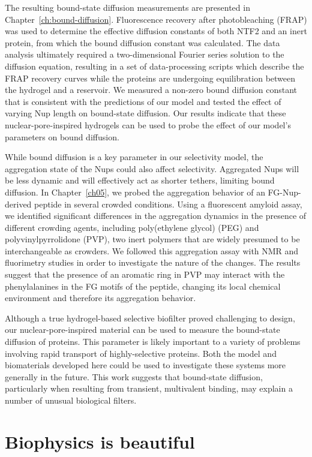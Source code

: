 The resulting bound-state diffusion measurements are presented in Chapter~\ref{ch:bound-diffusion}.  Fluorescence recovery after photobleaching (FRAP) was used to determine the effective diffusion constants of both NTF2 and an inert protein, from which the bound diffusion constant was calculated.  The data analysis ultimately required a two-dimensional Fourier series solution to the diffusion equation, resulting in a set of data-processing scripts which describe the FRAP recovery curves while the proteins are undergoing equilibration between the hydrogel and a reservoir.  We measured a non-zero bound diffusion constant that is consistent with the predictions of our model and tested the effect of varying Nup length on bound-state diffusion.  Our results indicate that these nuclear-pore-inspired hydrogels can be used to probe the effect of our model's parameters on bound diffusion.

While bound diffusion is a key parameter in our selectivity model, the aggregation state of the Nups could also affect selectivity.  Aggregated Nups will be less dynamic and will effectively act as shorter tethers, limiting bound diffusion.  In Chapter~\ref{ch05}, we probed the aggregation behavior of an FG-Nup-derived peptide in several crowded conditions.  Using a fluorescent amyloid assay, we identified significant differences in the aggregation dynamics in the presence of different crowding agents, including poly(ethylene glycol) (PEG) and polyvinylpyrrolidone (PVP), two inert polymers that are widely presumed to be interchangeable as crowders.  We followed this aggregation assay with NMR and fluorimetry studies in order to investigate the nature of the changes.  The results suggest that the presence of an aromatic ring in PVP may interact with the phenylalanines in the FG motifs of the peptide, changing its local chemical environment and therefore its aggregation behavior.

Although a true hydrogel-based selective biofilter proved challenging to design, our nuclear-pore-inspired material can be used to measure the bound-state diffusion of proteins.  This parameter is likely important to a variety of problems involving rapid transport of highly-selective proteins.  Both the model and biomaterials developed here could be used to investigate these systems more generally in the future.  This work suggests that bound-state diffusion, particularly when resulting from transient, multivalent binding, may explain a number of unusual biological filters.

\section{Biophysics is beautiful}

